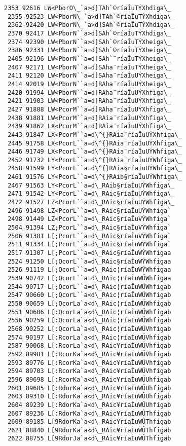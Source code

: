 \documentclass[11pt]{article}
\begin{document}
\begin{Verbatim}[commandchars=\\\{\}]
 2353 92616 LW<PborO\_`a>d]TAh`©ríaÎuTÝXhdiga\_
 2355 92523 LW<PborN\_`a>d]TAh`©ríaÎuTÝXhdiga\_
 2362 92420 LW<PborN\_`a>d]SAh`©ríaÎuTÝXhdiga\_
 2370 92417 LW<PborN``a>d]SAh`©ríaÎuTÝXhdiga\_
 2374 92390 LW<PborN``a>d]SAh`©ríaÎuTÝXheiga\_
 2386 92331 LW<PborN``a=d]SAh`©ríaÎuTÝXheiga\_
 2405 92196 LW<PborN``a=d]SAh`¨ríaÎuTÝXheiga\_
 2407 92171 LW<PborN``a=d]SAha¨ríaÎuTÝXheiga\_
 2411 92120 LW<PborN``a=d]SAha¨ríaÎuUÝXheiga\_
 2414 92019 LW<PborN``a=d]RAha¨ríaÎuUÝXheiga\_
 2420 91994 LW<PborN``a=d]RAha¨ríaÎuUÝXhfiga\_
 2421 91903 LW<PborM``a=d]RAha¨ríaÎuUÝXhfiga\_
 2427 91888 LW<PcorM``a=d]RAha¨ríaÎuUÝXhfiga\_
 2438 91881 LW<PcorM``a=d]RAia¨ríaÎuUÝXhfiga\_
 2439 91862 LX<PcorM``a=d]RAia¨ríaÎuUÝXhfiga\_
 2443 91847 LX<PcorM``a=d\^{}RAia¨ríaÎuUÝXhfiga\_
 2445 91758 LX<PcorL``a=d\^{}RAia¨ríaÎuUÝXhfiga\_
 2446 91749 LX<PcorL``a=d\^{}RAia¨ríaÎuUÝWhfiga\_
 2452 91732 LY<PcorL``a=d\^{}RAia¨ríaÎuUÝWhfiga\_
 2458 91599 LY<PcorL``a=d\^{}RAia§ríaÎuUÝWhfiga\_
 2461 91576 LY<PcorL``a=d\^{}RAib§ríaÎuUÝWhfiga\_
 2467 91563 LY<PcorL``a=d\_RAib§ríaÎuUÝWhfiga\_
 2471 91542 LY<PcorL``a=d\_RAic§ríaÎuUÝWhfiga\_
 2472 91527 LZ<PcorL``a=d\_RAic§ríaÎuUÝWhfiga\_
 2496 91498 LZ<PcorL``a=d\_RAic§ríaÎuUÝWhfiga`
 2498 91449 LZ<PcorL``a=d\_RAic§ríaÎuVÝWhfiga`
 2504 91394 LZ;PcorL``a=d\_RAic§ríaÎuVÝWhfiga`
 2506 91381 L[;PcorL``a=d\_RAic§ríaÎuVÝWhfiga`
 2511 91334 L[;PcorL``a=d\_RAic§ríaÎuWÝWhfiga`
 2517 91307 L[;PcorL``a=d\_RAic§ríaÎuWÝWhfigaa
 2524 91250 L[;QcorL``a=d\_RAic§ríaÎuWÝWhfigaa
 2526 91119 L[;QcorL``a=d\_RAic¦ríaÎuWÝWhfigaa
 2539 90742 L[;QcorL``a=d\_RAic¦ríaÎuWÜWhfigaa
 2544 90717 L[;QcorL``a=d\_RAic¦ríaÎuWÜWhfigab
 2547 90660 L[;QcorL``a<d\_RAic¦ríaÎuWÜWhfigab
 2550 90659 L[;QcorLa`a<d\_RAic¦ríaÎuWÜWhfigab
 2551 90606 L[:QcorLa`a<d\_RAic¦ríaÎuWÜWhfigab
 2556 90259 L[:QcorLa`a<d\_RAic¦ríaÍuWÜWhfigab
 2568 90252 L[:QcorLa`a<d\_RAic¦ríaÍuWÜVhfigab
 2574 90197 L[:RcorLa`a<d\_RAic¦ríaÍuWÜVhfigab
 2587 90068 L[:RcorLa`a<d\_RAic¥ríaÍuWÜVhfigab
 2592 89981 L[:RcorKa`a<d\_RAic¥ríaÍuWÜVhfigab
 2593 89776 L[:RcorKa`a<d\_RAic¥ríaÍuWÜVhfigab
 2594 89703 L[:RcorKa`a<d\_RAic¥ríaÍuWÜVhfigab
 2596 89698 L[:RcorKa`a<d\_RAic¥ríaÍuWÜUhfigab
 2601 89685 L[:RdorKa`a<d\_RAic¥ríaÍuWÜUhfigab
 2603 89310 L[:RdorKa`a<d\_RAic¥ríaÍuWÛUhfigab
 2604 89239 L[:RdorKa`a<d\_RAic¥ríaÍuWÛUhfigab
 2607 89236 L[:RdorKa`a<d\_RAic¥ríaÍuWÛThfigab
 2609 89185 L[9RdorKa`a<d\_RAic¥ríaÍuWÛThfigab
 2621 88840 L[9RdorKa`a<d\_RAic¥ríaÌuWÛThfigab
 2622 88755 L[9RdorJa`a<d\_RAic¥ríaÌuWÛThfigab

\end{Verbatim}
\end{document}
